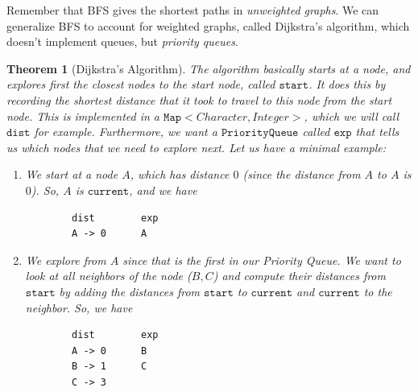 \documentclass{article}
\newtheorem{theorem}{Theorem}[section]
\theoremstyle{definition}
\theoremstyle{remark}
\theoremstyle{definition}
\begin{document}
Remember that BFS gives the shortest paths in \textit{unweighted graphs}. We can generalize BFS to account for weighted graphs, called Dijkstra's algorithm, which doesn't implement queues, but \textit{priority queues}. 

\begin{theorem}[Dijkstra's Algorithm]
The algorithm basically starts at a node, and explores \textit{first} the closest nodes to the start node, called $\texttt{start}$. It does this by recording the shortest distance that it took to travel to this node from the start node. This is implemented in a $\texttt{Map}<Character, Integer>$, which we will call $\texttt{dist}$ for example. Furthermore, we want a $\texttt{PriorityQueue}$ called $\texttt{exp}$ that tells us which nodes that we need to explore next. Let us have a minimal example: 
\begin{center}
\end{center}
\begin{enumerate}
    \item We start at a node $A$, which has distance $0$ (since the distance from $A$ to $A$ is $0$). So, $A$ is $\texttt{current}$, and we have 
    \begin{verbatim}
        dist        exp 
        A -> 0      A 
    \end{verbatim}
    \item We explore from $A$ since that is the first in our Priority Queue. We want to look at all neighbors of the node ($B, C$) and compute their distances from $\texttt{start}$ by adding the distances from $\texttt{start}$ to $\texttt{current}$ and $\texttt{current}$ to the neighbor. So, we have 
    \begin{verbatim}
        dist        exp 
        A -> 0      B
        B -> 1      C 
        C -> 3      
    \end{verbatim}
    

\end{enumerate}
\end{theorem}
\end{document}
